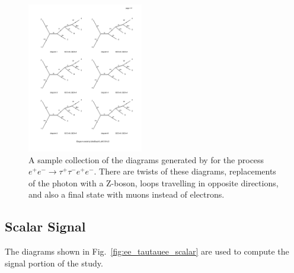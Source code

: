 \begin{figure}[h]
    \includegraphics[width=0.45\textwidth,clip=true,viewport=400 220 600 340,page=6]{Figures/madgraph_diagrams/ee_tautauee_background.pdf}
    \caption{A sample collection of the diagrams generated by \madgraph for the process $e^+ e^- \rightarrow \tau^+ \tau^- e^+ e^-$. There are twists of these diagrams, replacements of the photon with a Z-boson, loops travelling in opposite directions, and also a final state with muons instead of electrons.}
    \label{fig:ee_tautauee_background}
\end{figure}

\subsection{Scalar Signal}
The diagrams shown in Fig.\ \ref{fig:ee_tautauee_scalar} are used to compute the signal portion of the study.

